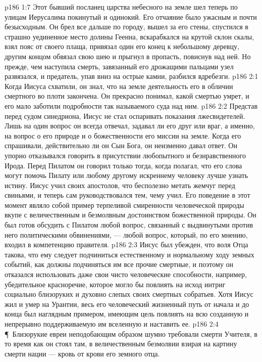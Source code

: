 \vs p186 1:7 Этот бывший посланец царства небесного на земле шел теперь по улицам Иерусалима покинутый и одинокий. Его отчаяние было ужасным и почти безысходным. Он брел все дальше по городу, вышел за его стены, спустился в страшно уединенное место долины Геенна, вскарабкался на крутой склон скалы, взял пояс от своего плаща, привязал один его конец к небольшому деревцу, другим концом обвязал свою шею и прыгнул в пропасть, повиснув над ней. Но прежде, чем наступила смерть, завязанный его дрожащими пальцами узел развязался, и предатель, упав вниз на острые камни, разбился вдребезги.
\vs p186 2:1 Когда Иисуса схватили, он знал, что на земле деятельность его в обличии смертного во плоти закончена. Он прекрасно понимал, какой смертью умрет, и его мало заботили подробности так называемого суда над ним.
\vs p186 2:2 Представ перед судом синедриона, Иисус не стал оспаривать показания лжесвидетелей. Лишь на один вопрос он всегда отвечал, задавал ли его друг или враг, а именно, на вопрос о его природе и о божественности его миссии на земле. Когда его спрашивали, действительно ли он Сын Бога, он неизменно давал ответ. Он упорно отказывался говорить в присутствии любопытного и безнравственного Ирода. Перед Пилатом он говорил только тогда, когда полагал, что его слова могут помочь Пилату или любому другому искреннему человеку лучше узнать истину. Иисус учил своих апостолов, что бесполезно метать жемчуг перед свиньями, и теперь сам руководствовался тем, чему учил. Его поведение в этот момент являло собой пример терпеливой смиренности человеческой природы вкупе с величественным и безмолвным достоинством божественной природы. Он был готов обсудить с Пилатом любой вопрос, связанный с выдвинутыми против него политическими обвинениями, --- любой вопрос, который, по его мнению, входил в компетенцию правителя.
\vs p186 2:3 Иисус был убежден, что воля Отца такова, что ему следует подчиниться естественному и нормальному ходу земных событий, как должны подчиняться им все прочие смертные, и поэтому он отказался использовать даже свои чисто человеческие способности, например, убедительное красноречие, которое могло бы повлиять на исход интриг социально близоруких и духовно слепых своих смертных собратьев. Хотя Иисус жил и умер на Урантии, весь его человеческий жизненный путь от начала и до конца был наглядным примером, имеющим цель повлиять на всю созданную и непрерывно поддерживаемую им вселенную и наставить ее.
\vs p186 2:4 \P\ Близорукие евреи неподобающим образом шумно требовали смерти Учителя, в то время как он стоял там, в величественным безмолвии взирая на картину смерти нации --- кровь от крови его земного отца.
